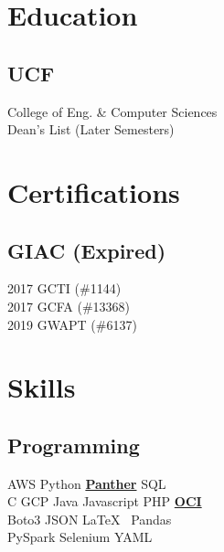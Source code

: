\documentclass[letterpaper]{deedy-resume} %
\begin{document}
\begin{minipage}[t]{0.33\textwidth} %


\section{Education}
\subsection{UCF}
College of Eng. \& Computer Sciences\\
Dean's List (Later Semesters) \\

\sectionspace %



\section{Certifications}
\subsection{GIAC (Expired)}
2017 GCTI (\#1144) \\
2017 GCFA (\#13368) \\
2019 GWAPT (\#6137) \\
\sectionspace %


\section{Skills}

\subsection{Programming}
AWS \textbullet{} Python \textbullet{} \textbf{\href{https://docs.panther.com/}{Panther}} \textbullet{} SQL \\
C \textbullet{} GCP \textbullet{} Java \textbullet{} Javascript \textbullet{} PHP \textbullet{} \textbf{\href{https://www.oracle.com/cloud/}{OCI}} \\
Boto3 \textbullet{} JSON \textbullet{} \LaTeX\ \textbullet{} Pandas \\
PySpark \textbullet{} Selenium \textbullet{} YAML \\


\end{minipage}
\end{document}
